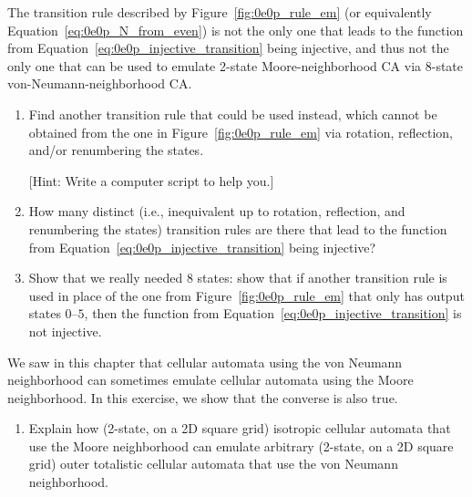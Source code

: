\begin{multicols}{2}
	
	\mfilbreak
	
	
	\begin{problem}\label{exer:0e0p_even_gen_transition_rule} 
		The transition rule described by Figure~\ref{fig:0e0p_rule_em} (or equivalently Equation~\eqref{eq:0e0p_N_from_even}) is not the only one that leads to the function from Equation~\eqref{eq:0e0p_injective_transition} being injective, and thus not the only one that can be used to emulate 2-state Moore-neighborhood CA via 8-state von-Neumann-neighborhood CA.\smallskip
		
		\begin{enumerate}[label=\bf\color{ocre}(\alph*)]
			\item Find another transition rule that could be used instead, which cannot be obtained from the one in Figure~\ref{fig:0e0p_rule_em} via rotation, reflection, and/or renumbering the states.
			
			[Hint: Write a computer script to help you.]
			
			\item How many distinct (i.e., inequivalent up to rotation, reflection, and renumbering the states) transition rules are there that lead to the function from Equation~\eqref{eq:0e0p_injective_transition} being injective?
			
			\item Show that we really needed $8$ states: show that if another transition rule is used in place of the one from Figure~\ref{fig:0e0p_rule_em} that only has output states $0$--$5$, then the function from Equation~\eqref{eq:0e0p_injective_transition} is not injective.
		\end{enumerate}
	\end{problem}
	
	
	\mfilbreak
	
	
	\begin{problem}\label{exer:0e0p_iso_in_moore_emulate_von} 
		We saw in this chapter that cellular automata using the von Neumann neighborhood can sometimes emulate cellular automata using the Moore neighborhood. In this exercise, we show that the converse is also true.\smallskip
		
		\begin{enumerate}[label=\bf\color{ocre}(\alph*)]
			\item Explain how (2-state, on a 2D square grid) isotropic cellular automata that use the Moore neighborhood can emulate arbitrary (2-state, on a 2D square grid) outer totalistic cellular automata that use the von Neumann neighborhood.
			

\end{enumerate}
\end{problem}
\end{multicols}
